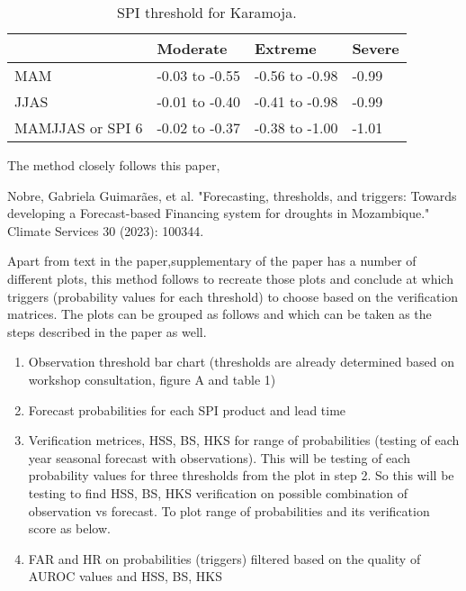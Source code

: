 \begin{table}[!ht]
	\centering
	\caption[SPI threshold for Karamoja ]{SPI threshold for Karamoja.}
	\label{tab:incpacks}
	\begin{tabular}{p{}p{}p{}p{}}
		\toprule
		&\textbf{Moderate} &\textbf{Extreme} &\textbf{Severe}\\
		\midrule
	MAM &-0.03 to -0.55 &-0.56 to -0.98 &-0.99 \\
	JJAS &-0.01 to -0.40 &-0.41 to -0.98 &-0.99 \\
	MAMJJAS or SPI 6 &-0.02 to -0.37 &-0.38 to -1.00 &-1.01 \\
		\bottomrule
	\end{tabular}
\end{table}




The method closely follows this paper,

Nobre, Gabriela Guimarães, et al. "Forecasting, thresholds, and triggers: Towards developing a Forecast-based Financing system for droughts in Mozambique." Climate Services 30 (2023): 100344. 

Apart from text in the paper,supplementary of the paper has a number of different plots, this method follows to recreate those plots and conclude at which triggers (probability values for each threshold) to choose based on the verification matrices. The plots can be grouped as follows and which can be taken as the steps described in the paper as well.  

\begin{enumerate}
	\item Observation threshold bar chart (thresholds are already determined based on workshop consultation, figure A and table 1) 
	\item Forecast probabilities for each SPI product and lead time 
	\item Verification metrices, HSS, BS, HKS for range of probabilities (testing of each year seasonal forecast with observations). This will be testing of each probability values for three thresholds from the plot in step 2. So this will be testing to find HSS, BS, HKS verification on possible combination of observation vs forecast. To plot range of probabilities and its verification score as below.
	\item FAR and HR on probabilities (triggers) filtered based on the quality of AUROC values and HSS, BS, HKS 
\end{enumerate}


